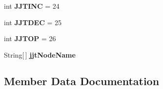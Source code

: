 \begin{DoxyCompactItemize}
\item 
int {\bfseries J\+J\+T\+I\+NC} = 24\hypertarget{interfacepack_1_1_my_new_grammar_tree_constants_aa40dd762fd58fbf9ac36f5e1296b31b3}{}\label{interfacepack_1_1_my_new_grammar_tree_constants_aa40dd762fd58fbf9ac36f5e1296b31b3}

\item 
int {\bfseries J\+J\+T\+D\+EC} = 25\hypertarget{interfacepack_1_1_my_new_grammar_tree_constants_a828a76e152c440eb061cbbf8c7a8e86e}{}\label{interfacepack_1_1_my_new_grammar_tree_constants_a828a76e152c440eb061cbbf8c7a8e86e}

\item 
int {\bfseries J\+J\+T\+OP} = 26\hypertarget{interfacepack_1_1_my_new_grammar_tree_constants_a3dee68280f9eef53bc8c1dfb1eb6a615}{}\label{interfacepack_1_1_my_new_grammar_tree_constants_a3dee68280f9eef53bc8c1dfb1eb6a615}

\item 
String\mbox{[}$\,$\mbox{]} {\bfseries jjt\+Node\+Name}
\end{DoxyCompactItemize}


\subsection{Member Data Documentation}
